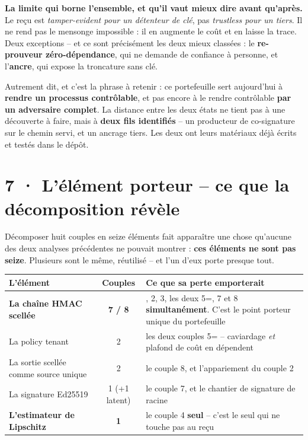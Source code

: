 \documentclass[10pt]{article}
\newcommand{\best}[1]{{\color{green}\textbf{#1}}}
\newcommand{\pire}[1]{{\color{red}\textbf{#1}}}
\newcommand{\sz}[1]{{\small\color{grey}\textsf{#1}}}
\begin{document}
\begin{alerte}
\textbf{La limite qui borne l'ensemble, et qu'il vaut mieux dire avant qu'après.} Le reçu est
\emph{tamper-evident pour un détenteur de clé}, pas \emph{trustless pour un tiers}. Il ne rend pas le
mensonge impossible : il en augmente le coût et en laisse la trace. Deux exceptions -- et ce sont
précisément les deux mieux classées : le \textbf{re-prouveur zéro-dépendance}, qui ne demande de
confiance à personne, et l'\textbf{ancre}, qui expose la troncature sans clé.
\end{alerte}

Autrement dit, et c'est la phrase à retenir : ce portefeuille sert aujourd'hui à \textbf{rendre un
processus contrôlable}, et pas encore à le rendre contrôlable \textbf{par un adversaire complet}. La
distance entre les deux états ne tient pas à une découverte à faire, mais à \textbf{deux fils
identifiés} -- un producteur de co-signature sur le chemin servi, et un ancrage tiers. Les deux ont
leurs matériaux déjà écrits et testés dans le dépôt.

\section{7 · L'élément porteur -- ce que la décomposition révèle}

Décomposer huit couples en seize éléments fait apparaître une chose qu'aucune des deux analyses
précédentes ne pouvait montrer : \textbf{ces éléments ne sont pas seize}. Plusieurs sont le même,
réutilisé -- et l'un d'eux porte presque tout.

\renewcommand{\arraystretch}{1.15}
\begin{center}\small
\begin{tabular}{@{}>{\raggedright\arraybackslash}p{5.1cm} c >{\raggedright\arraybackslash}p{9.6cm}@{}}
\toprule
\textbf{L'élément} & \textbf{Couples} & \textbf{Ce que sa perte emporterait} \\
\midrule
\textbf{La chaîne HMAC scellée} & \pire{7 / 8} &
  1, 2, 3, les deux 5=, 7 et 8 \textbf{simultanément}. C'est le point porteur unique du portefeuille \\
La policy tenant & 2 & les deux couples 5= -- caviardage \emph{et} plafond de coût en dépendent \\
La sortie scellée comme source unique & 2 & le couple 8, et l'appariement du couple 2 \\
La signature Ed25519 & 1 \sz{(+1 latent)} & le couple 7, et le chantier de signature de racine \\
\midrule
\textbf{L'estimateur de Lipschitz} & \best{1} &
  le couple 4 \textbf{seul} -- c'est le seul qui ne touche pas au reçu \\
\bottomrule
\end{tabular}
\end{center}
\end{document}
